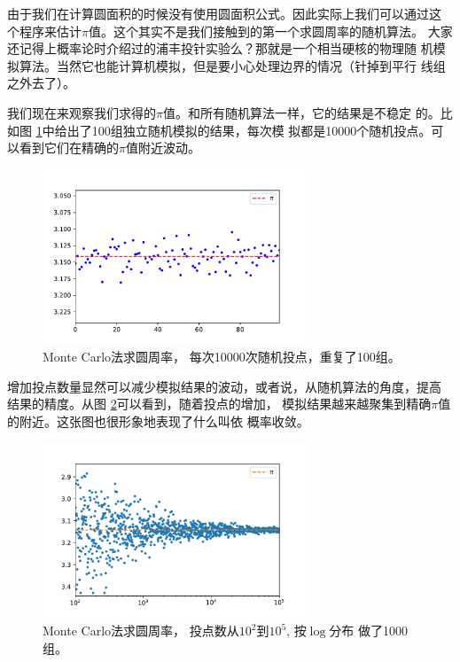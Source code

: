 
由于我们在计算圆面积的时候没有使用圆面积公式。因此实际上我们可以通过这
个程序来估计$\pi$值。这个其实不是我们接触到的第一个求圆周率的随机算法。
大家还记得上概率论时介绍过的浦丰投针实验么？那就是一个相当硬核的物理随
机模拟算法。当然它也能计算机模拟，但是要小心处理边界的情况（针掉到平行
  线组之外去了）。

我们现在来观察我们求得的$\pi$值。和所有随机算法一样，它的结果是不稳定
的。比如图 \ref{fig::variation}中给出了100组独立随机模拟的结果，每次模
拟都是10000个随机投点。可以看到它们在精确的$\pi$值附近波动。

\begin{figure}[!ht]
\centering
\includegraphics[width=0.7\textwidth]{images/variation.pdf}
\caption{Monte Carlo法求圆周率， 每次10000次随机投点，重复了100组。}
\label{fig::variation}
\end{figure}

增加投点数量显然可以减少模拟结果的波动，或者说，从随机算法的角度，提高
结果的精度。从图 \ref{fig::number2variation}可以看到，随着投点的增加，
模拟结果越来越聚集到精确$\pi$值的附近。这张图也很形象地表现了什么叫依
概率收敛。

\begin{figure}[!ht]
\centering
\includegraphics[width=0.7\textwidth]{images/number2variation.pdf}
\caption{Monte Carlo法求圆周率， 投点数从$10^2$到$10^5$, 按$\log$分布
  做了1000组。}
\label{fig::number2variation}
\end{figure}

